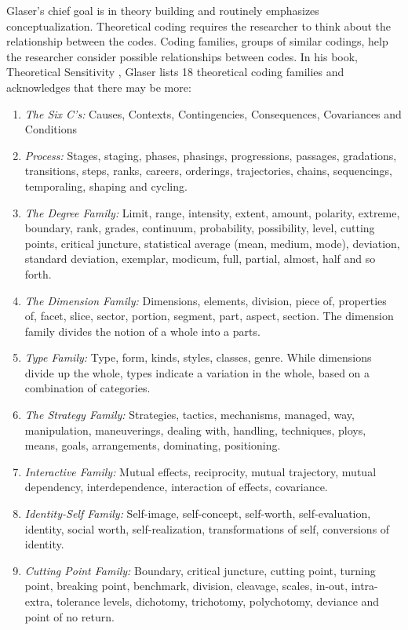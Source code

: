 Glaser's chief goal is in theory building and routinely emphasizes conceptualization. Theoretical coding requires the researcher to think about the relationship between the codes. Coding families, groups of similar codings, help the researcher consider possible relationships between codes.  In his book, Theoretical Sensitivity \cite{GlaserTheoreticalSensitivity}, Glaser lists 18 theoretical coding families and acknowledges that there may be more:
\begin{enumerate}
\item \textit{The Six C's:} Causes, Contexts, Contingencies, Consequences, Covariances and Conditions
\item \textit{Process:} Stages, staging, phases, phasings, progressions, passages, gradations, transitions, steps, ranks, careers, orderings, trajectories, chains, sequencings, temporaling, shaping and cycling.
\item \textit{The Degree Family:} Limit, range, intensity, extent, amount, polarity, extreme, boundary, rank, grades, continuum, probability, possibility, level, cutting points, critical juncture, statistical average (mean, medium, mode), deviation, standard deviation, exemplar, modicum, full, partial, almost, half and so forth.
\item \textit{The Dimension Family:} Dimensions, elements, division, piece of, properties of, facet, slice, sector, portion, segment, part, aspect, section. The dimension family divides the notion of a whole into a parts. 
\item \textit{Type Family:} Type, form, kinds, styles, classes, genre. While dimensions divide up the whole, types indicate a variation in the whole, based on a combination of categories. 
\item \textit{The Strategy Family:} Strategies, tactics, mechanisms, managed, way, manipulation, maneuverings, dealing with, handling, techniques, ploys, means, goals, arrangements, dominating, positioning. 
\item \textit{Interactive Family:} Mutual effects, reciprocity, mutual trajectory, mutual dependency, interdependence, interaction of effects, covariance. 
\item \textit{Identity-Self Family:} Self-image, self-concept, self-worth, self-evaluation, identity, social worth, self-realization, transformations of self, conversions of identity.
\item \textit{Cutting Point Family:} Boundary, critical juncture, cutting point, turning point, breaking point, benchmark, division, cleavage, scales, in-out, intra-extra, tolerance levels, dichotomy, trichotomy, polychotomy, deviance and point of no return.

\end{enumerate}
